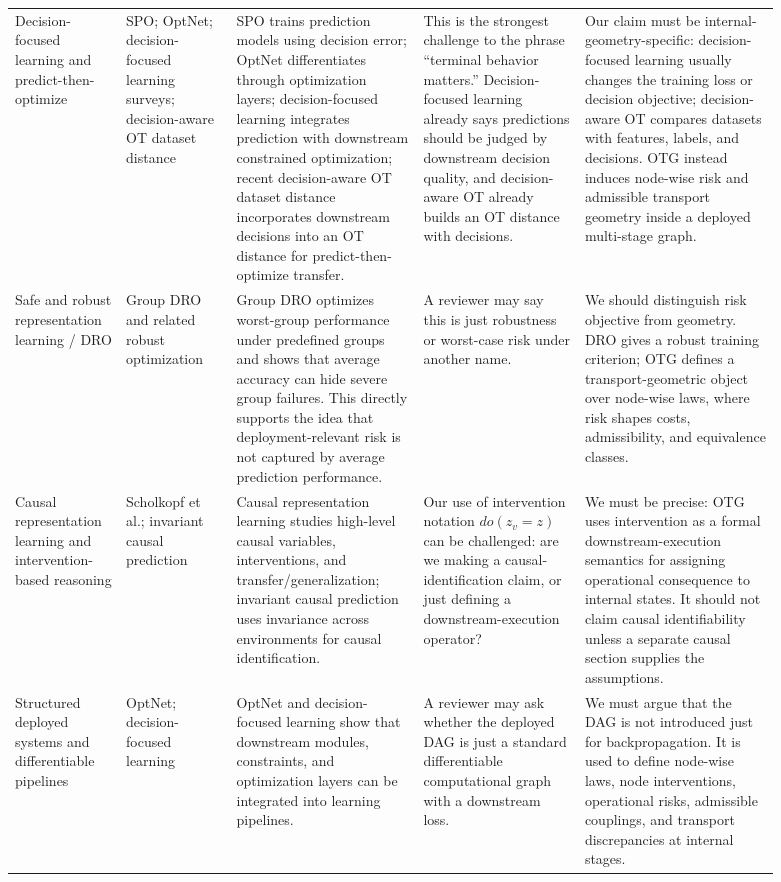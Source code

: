 \documentclass[11pt,a4paper]{article}
\begin{document}
\begin{landscape}
\begin{longtable}{@{}P{0.12\linewidth} P{0.13\linewidth} P{0.22\linewidth} P{0.19\linewidth} P{0.23\linewidth}@{}}
Decision-focused learning and predict-then-optimize & SPO; OptNet; decision-focused learning surveys; decision-aware OT dataset distance & SPO trains prediction models using decision error; OptNet differentiates through optimization layers; decision-focused learning integrates prediction with downstream constrained optimization; recent decision-aware OT dataset distance incorporates downstream decisions into an OT distance for predict-then-optimize transfer. & This is the strongest challenge to the phrase ``terminal behavior matters.'' Decision-focused learning already says predictions should be judged by downstream decision quality, and decision-aware OT already builds an OT distance with decisions. & Our claim must be internal-geometry-specific: decision-focused learning usually changes the training loss or decision objective; decision-aware OT compares datasets with features, labels, and decisions. OTG instead induces node-wise risk and admissible transport geometry inside a deployed multi-stage graph.\\
Safe and robust representation learning / DRO & Group DRO and related robust optimization & Group DRO optimizes worst-group performance under predefined groups and shows that average accuracy can hide severe group failures. This directly supports the idea that deployment-relevant risk is not captured by average prediction performance. & A reviewer may say this is just robustness or worst-case risk under another name. & We should distinguish risk objective from geometry. DRO gives a robust training criterion; OTG defines a transport-geometric object over node-wise laws, where risk shapes costs, admissibility, and equivalence classes.\\
Causal representation learning and intervention-based reasoning & Scholkopf et al.; invariant causal prediction & Causal representation learning studies high-level causal variables, interventions, and transfer/generalization; invariant causal prediction uses invariance across environments for causal identification. & Our use of intervention notation \(do(z_v=z)\) can be challenged: are we making a causal-identification claim, or just defining a downstream-execution operator? & We must be precise: OTG uses intervention as a formal downstream-execution semantics for assigning operational consequence to internal states. It should not claim causal identifiability unless a separate causal section supplies the assumptions.\\
Structured deployed systems and differentiable pipelines & OptNet; decision-focused learning & OptNet and decision-focused learning show that downstream modules, constraints, and optimization layers can be integrated into learning pipelines. & A reviewer may ask whether the deployed DAG is just a standard differentiable computational graph with a downstream loss. & We must argue that the DAG is not introduced just for backpropagation. It is used to define node-wise laws, node interventions, operational risks, admissible couplings, and transport discrepancies at internal stages.\\

\end{longtable}
\end{landscape}
\end{document}
